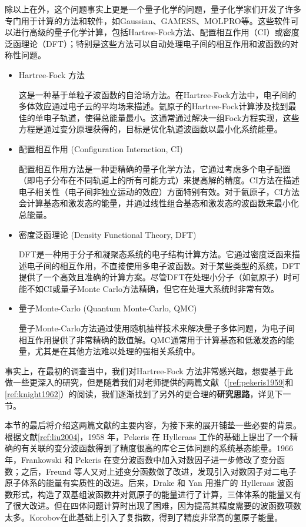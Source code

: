 除以上在外，这个问题事实上更是一个量子化学的问题，量子化学家们开发了许多专门用于计算的方法和软件，如Gaussian、GAMESS、MOLPRO等。这些软件可以进行高级的量子化学计算，包括Hartree-Fock方法、配置相互作用（CI）或密度泛函理论（DFT）；特别是这些方法可以自动处理电子间的相互作用和波函数的对称性问题。
\begin{itemize}
	\item Hartree-Fock 方法
	
	这是一种基于单粒子波函数的自洽场方法。在Hartree-Fock方法中，电子间的多体效应通过电子云的平均场来描述。氦原子的Hartree-Fock计算涉及找到最佳的单电子轨道，使得总能量最小。这通常通过解决一组Fock方程实现，这些方程是通过变分原理获得的，目标是优化轨道波函数以最小化系统能量。
	
	\item 配置相互作用 (Configuration Interaction, CI)
	
	配置相互作用方法是一种更精确的量子化学方法，它通过考虑多个电子配置（即电子分布在不同轨道上的所有可能方式）来提高解的精度。CI方法在描述电子相关性（电子间非独立运动的效应）方面特别有效。对于氦原子，CI方法会计算基态和激发态的能量，并通过线性组合基态和激发态的波函数来最小化总能量。
	
	\item 密度泛函理论 (Density Functional Theory, DFT)
	
	DFT是一种用于分子和凝聚态系统的电子结构计算方法。它通过密度泛函来描述电子间的相互作用，不直接使用多电子波函数。对于某些类型的系统，DFT提供了一个高效且准确的计算方案。尽管DFT在处理小分子（如氦原子）时可能不如CI或量子Monte Carlo方法精确，但它在处理大系统时非常有效。
	
	\item 量子Monte-Carlo (Quantum Monte-Carlo, QMC)
	
	量子Monte-Carlo方法通过使用随机抽样技术来解决量子多体问题，为电子间相互作用提供了非常精确的数值解。QMC通常用于计算基态和低激发态的能量，尤其是在其他方法难以处理的强相关系统中。
\end{itemize}

事实上，在最初的调查当中，我们对Hartree-Fock 方法非常感兴趣，想要基于此做一些更深入的研究，但是随着我们对老师提供的两篇文献（\cref{ref:pekeris1959}和\cref{ref:knight1962}）的阅读，我们逐渐找到了另外的更合理的\textbf{研究思路}，详见下一节。

本节的最后将介绍这两篇文献的主要内容，为接下来的展开铺垫一些必要的背景。根据文献\cref{ref:liu2004}，1958 年，Pekeris 在 Hylleraas 工作的基础上提出了一个精确的有关联的变分波函数得到了精度很高的库仑三体问题的系统基态能量。1966 年，Frankowski 和 Pekeris 在变分波函数中加入对数因子进一步修改了变分函数；之后，Freund 等人又对上述变分函数做了改进，发现引入对数因子对二电子原子体系的能量有实质性的改进。后来，Drake 和 Yan 用推广的 Hylleraas 波函数形式，构造了双基组波函数并对氦原子的能量进行了计算，三体体系的能量又有了很大改进。但在四体问题计算时出现了困难，因为提高其精度需要的波函数项数太多。Korobov在此基础上引入了复指数，得到了精度非常高的氢原子能量。


